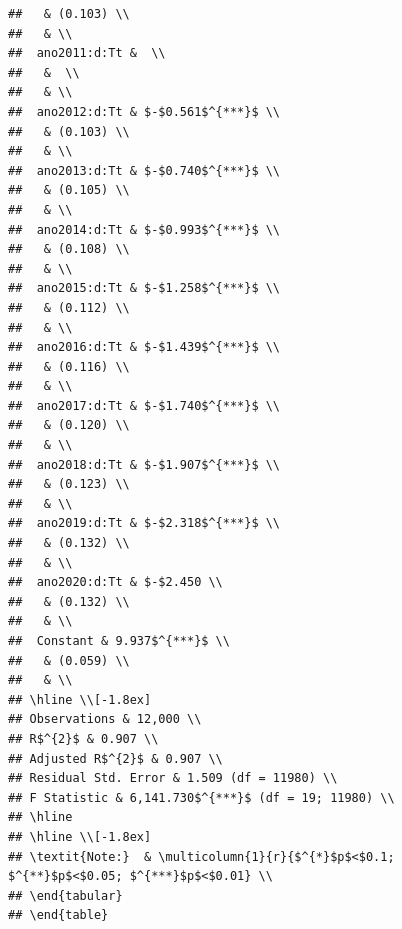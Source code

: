 \documentclass[
]{article}
\begin{document}
\begin{verbatim}
##   & (0.103) \\ 
##   & \\ 
##  ano2011:d:Tt &  \\ 
##   &  \\ 
##   & \\ 
##  ano2012:d:Tt & $-$0.561$^{***}$ \\ 
##   & (0.103) \\ 
##   & \\ 
##  ano2013:d:Tt & $-$0.740$^{***}$ \\ 
##   & (0.105) \\ 
##   & \\ 
##  ano2014:d:Tt & $-$0.993$^{***}$ \\ 
##   & (0.108) \\ 
##   & \\ 
##  ano2015:d:Tt & $-$1.258$^{***}$ \\ 
##   & (0.112) \\ 
##   & \\ 
##  ano2016:d:Tt & $-$1.439$^{***}$ \\ 
##   & (0.116) \\ 
##   & \\ 
##  ano2017:d:Tt & $-$1.740$^{***}$ \\ 
##   & (0.120) \\ 
##   & \\ 
##  ano2018:d:Tt & $-$1.907$^{***}$ \\ 
##   & (0.123) \\ 
##   & \\ 
##  ano2019:d:Tt & $-$2.318$^{***}$ \\ 
##   & (0.132) \\ 
##   & \\ 
##  ano2020:d:Tt & $-$2.450 \\ 
##   & (0.132) \\ 
##   & \\ 
##  Constant & 9.937$^{***}$ \\ 
##   & (0.059) \\ 
##   & \\ 
## \hline \\[-1.8ex] 
## Observations & 12,000 \\ 
## R$^{2}$ & 0.907 \\ 
## Adjusted R$^{2}$ & 0.907 \\ 
## Residual Std. Error & 1.509 (df = 11980) \\ 
## F Statistic & 6,141.730$^{***}$ (df = 19; 11980) \\ 
## \hline 
## \hline \\[-1.8ex] 
## \textit{Note:}  & \multicolumn{1}{r}{$^{*}$p$<$0.1; $^{**}$p$<$0.05; $^{***}$p$<$0.01} \\ 
## \end{tabular} 
## \end{table}
\end{verbatim}
\end{document}
